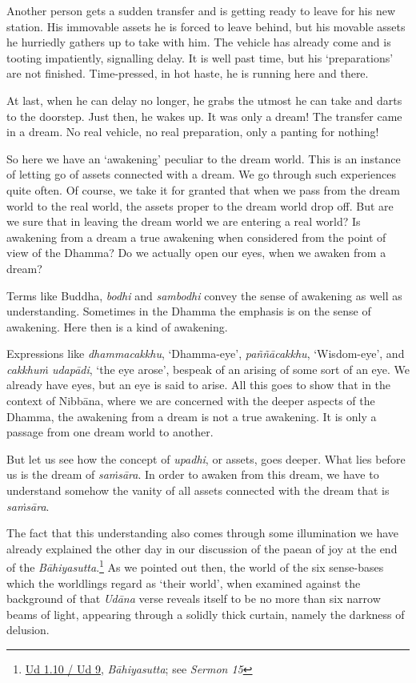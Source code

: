 Another person gets a sudden transfer and is getting ready to leave for his new station. His immovable assets he is forced to leave behind, but his movable assets he hurriedly gathers up to take with him. The vehicle has already come and is tooting impatiently, signalling delay. It is well past time, but his `preparations' are not finished. Time-pressed, in hot haste, he is running here and there.

At last, when he can delay no longer, he grabs the utmost he can take and darts to the doorstep. Just then, he wakes up. It was only a dream! The transfer came in a dream. No real vehicle, no real preparation, only a panting for nothing!

So here we have an `awakening' peculiar to the dream world. This is an instance of letting go of assets connected with a dream. We go through such experiences quite often. Of course, we take it for granted that when we pass from the dream world to the real world, the assets proper to the dream world drop off. But are we sure that in leaving the dream world we are entering a real world? Is awakening from a dream a true awakening when considered from the point of view of the Dhamma? Do we actually open our eyes, when we awaken from a dream?

Terms like Buddha, \emph{bodhi} and \emph{sambodhi} convey the sense of awakening as well as understanding. Sometimes in the Dhamma the emphasis is on the sense of awakening. Here then is a kind of awakening.

Expressions like \emph{dhammacakkhu}, `Dhamma-eye', \emph{paññācakkhu}, `Wisdom-eye', and \emph{cakkhuṁ udapādi}, `the eye arose', bespeak of an arising of some sort of an eye. We already have eyes, but an eye is said to arise. All this goes to show that in the context of Nibbāna, where we are concerned with the deeper aspects of the Dhamma, the awakening from a dream is not a true awakening. It is only a passage from one dream world to another.

But let us see how the concept of \emph{upadhi}, or assets, goes deeper. What lies before us is the dream of \emph{saṁsāra}. In order to awaken from this dream, we have to understand somehow the vanity of all assets connected with the dream that is \emph{saṁsāra}.

The fact that this understanding also comes through some illumination we have already explained the other day in our discussion of the paean of joy at the end of the \emph{Bāhiyasutta}.\footnote{\href{https://suttacentral.net/ud1.10/pli/ms}{Ud 1.10 / Ud 9}, \emph{Bāhiyasutta}; see \emph{Sermon 15}} As we pointed out then, the world of the six sense-bases which the worldlings regard as `their world', when examined against the background of that \emph{Udāna} verse reveals itself to be no more than six narrow beams of light, appearing through a solidly thick curtain, namely the darkness of delusion.

